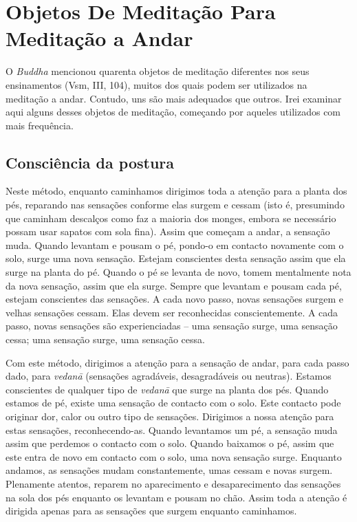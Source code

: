 \chapter{Objetos De Meditação Para Meditação a Andar}

O \emph{Buddha} mencionou quarenta objetos de meditação diferentes nos
seus ensinamentos (Vsm, III, 104), muitos dos quais podem ser utilizados
na meditação a andar. Contudo, uns são mais adequados que outros. Irei
examinar aqui alguns desses objetos de meditação, começando por aqueles
utilizados com mais frequência.

\section{Consciência da postura}

Neste método, enquanto caminhamos dirigimos toda a atenção para a planta
dos pés, reparando nas sensações conforme elas surgem e cessam (isto é,
presumindo que caminham descalços como faz a maioria dos monges, embora
se necessário possam usar sapatos com sola fina). Assim que começam a
andar, a sensação muda. Quando levantam e pousam o pé, pondo-o em
contacto novamente com o solo, surge uma nova sensação. Estejam
conscientes desta sensação assim que ela surge na planta do pé. Quando o
pé se levanta de novo, tomem mentalmente nota da nova sensação, assim
que ela surge. Sempre que levantam e pousam cada pé, estejam conscientes
das sensações. A cada novo passo, novas sensações surgem e velhas
sensações cessam. Elas devem ser reconhecidas conscientemente. A cada
passo, novas sensações são experienciadas -- uma sensação surge, uma
sensação cessa; uma sensação surge, uma sensação cessa.

Com este método, dirigimos a atenção para a sensação de andar, para cada
passo dado, para \emph{vedanā} (sensações agradáveis, desagradáveis ou
neutras). Estamos conscientes de qualquer tipo de \emph{vedanā} que
surge na planta dos pés. Quando estamos de pé, existe uma sensação de
contacto com o solo. Este contacto pode originar dor, calor ou outro
tipo de sensações. Dirigimos a nossa atenção para estas sensações,
reconhecendo-as. Quando levantamos um pé, a sensação muda assim que
perdemos o contacto com o solo. Quando baixamos o pé, assim que este
entra de novo em contacto com o solo, uma nova sensação surge. Enquanto
andamos, as sensações mudam constantemente, umas cessam e novas surgem.
Plenamente atentos, reparem no aparecimento e desaparecimento das
sensações na sola dos pés enquanto os levantam e pousam no chão. Assim
toda a atenção é dirigida apenas para as sensações que surgem enquanto
caminhamos.

